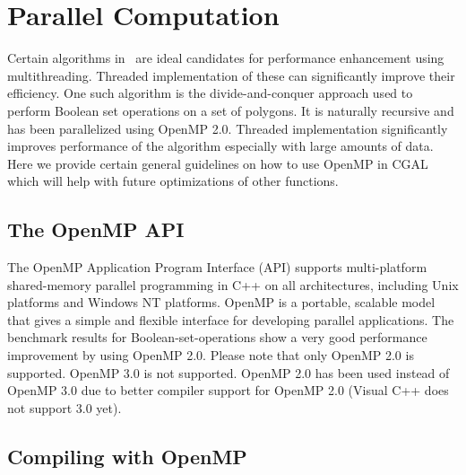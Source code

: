 
\chapter{Parallel Computation\label{chap:parallel_computation}}

Certain algorithms in \cgal\ are ideal candidates for performance enhancement using multithreading. Threaded implementation of these can significantly improve their efficiency.
One such algorithm is the divide-and-conquer approach used to perform Boolean set operations on a set of polygons. It is naturally recursive and has been parallelized using OpenMP 2.0. Threaded implementation significantly improves performance of the algorithm especially with large amounts of data. 
Here we provide certain general guidelines on how to use OpenMP in CGAL which will help with future optimizations of other functions.

\section{The OpenMP API\label{sec:openmp}}

The OpenMP Application Program Interface (API) supports multi-platform shared-memory parallel programming in C++ on all architectures, including Unix platforms and Windows NT platforms. OpenMP is a portable, scalable model that gives a simple and flexible interface for developing parallel applications.
The benchmark results for Boolean-set-operations show a very good performance improvement by using OpenMP 2.0.
Please note that only OpenMP 2.0 is supported. OpenMP 3.0 is not supported. OpenMP 2.0 has been used instead of OpenMP 3.0 due to better compiler support for OpenMP 2.0 (Visual C++ does not support 3.0 yet). 

\section{Compiling with OpenMP\label{sec:compiling_with_openmp}}

